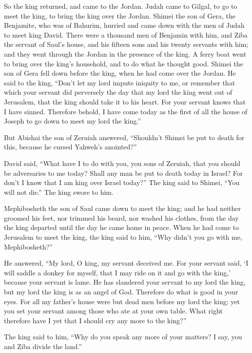 {\par }{\PP {}So the king returned, and came to the Jordan. Judah came to Gilgal, to go to meet the king, to bring the king over the Jordan.
Shimei the son of Gera, the Benjamite, who was of Bahurim, hurried and came down with the men of Judah to meet king David.
There were a thousand men of Benjamin with him, and Ziba the servant of Saul’s house, and his fifteen sons and his twenty servants with him; and they went through the Jordan in the presence of the king.
A ferry boat went to bring over the king’s household, and to do what he thought good. Shimei the son of Gera fell down before the king, when he had come over the Jordan.
He said to the king, “Don’t let my lord impute iniquity to me, or remember that which your servant did perversely the day that my lord the king went out of Jerusalem, that the king should take it to his heart.
For your servant knows that I have sinned. Therefore behold, I have come today as the first of all the house of Joseph to go down to meet my lord the king.”
\par }{\PP {}But Abishai the son of Zeruiah answered, “Shouldn’t Shimei be put to death for this, because he cursed Yahweh’s anointed?”
\par }{\PP {}David said, “What have I to do with you, you sons of Zeruiah, that you should be adversaries to me today? Shall any man be put to death today in Israel? For don’t I know that I am king over Israel today?”
The king said to Shimei, “You will not die.” The king swore to him.
\par }{\PP {}Mephibosheth the son of Saul came down to meet the king; and he had neither groomed his feet, nor trimmed his beard, nor washed his clothes, from the day the king departed until the day he came home in peace.
When he had come to Jerusalem to meet the king, the king said to him, “Why didn’t you go with me, Mephibosheth?”
\par }{\PP {}He answered, “My lord, O king, my servant deceived me. For your servant said, ‘I will saddle a donkey for myself, that I may ride on it and go with the king,’ because your servant is lame.
He has slandered your servant to my lord the king, but my lord the king is as an angel of God. Therefore do what is good in your eyes.
For all my father’s house were but dead men before my lord the king; yet you set your servant among those who ate at your own table. What right therefore have I yet that I should cry any more to the king?”
\par }{\PP {}The king said to him, “Why do you speak any more of your matters? I say, you and Ziba divide the land.”
}
